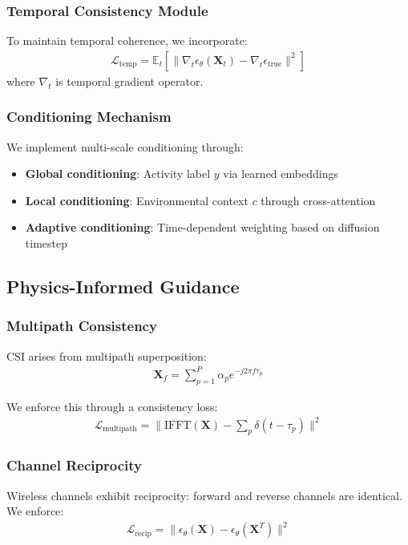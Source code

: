\documentclass[journal]{IEEEtran}
\begin{document}
\subsubsection{Temporal Consistency Module}
To maintain temporal coherence, we incorporate:
\begin{align}
\mathcal{L}_{\text{temp}} = \mathbb{E}_{t}[\|\nabla_t \epsilon_\theta(\mathbf{X}_t) - \nabla_t \epsilon_{\text{true}}\|^2]
\end{align}
where $\nabla_t$ is temporal gradient operator.

\subsubsection{Conditioning Mechanism}
We implement multi-scale conditioning through:
\begin{itemize}
\item \textbf{Global conditioning}: Activity label $y$ via learned embeddings
\item \textbf{Local conditioning}: Environmental context $c$ through cross-attention
\item \textbf{Adaptive conditioning}: Time-dependent weighting based on diffusion timestep
\end{itemize}

\subsection{Physics-Informed Guidance}

\subsubsection{Multipath Consistency}
CSI arises from multipath superposition:
\begin{align}
\mathbf{X}_f = \sum_{p=1}^{P} \alpha_p e^{-j2\pi f\tau_p}
\end{align}

We enforce this through a consistency loss:
\begin{align}
\mathcal{L}_{\text{multipath}} = \|\text{IFFT}(\mathbf{X}) - \sum_p \delta(t-\tau_p)\|^2
\end{align}

\subsubsection{Channel Reciprocity}
Wireless channels exhibit reciprocity: forward and reverse channels are identical. We enforce:
\begin{align}
\mathcal{L}_{\text{recip}} = \|\epsilon_\theta(\mathbf{X}) - \epsilon_\theta(\mathbf{X}^T)\|^2
\end{align}
\end{document}
